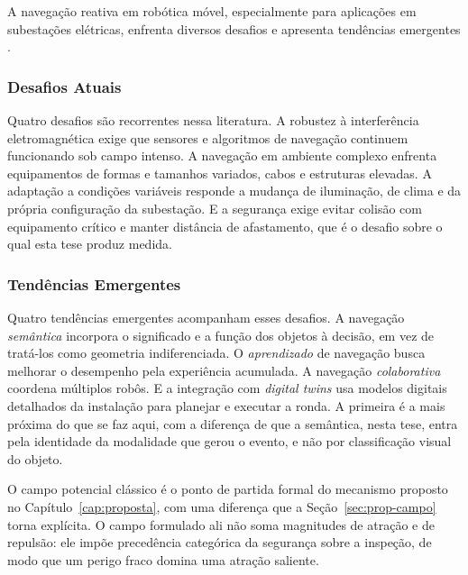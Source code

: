 A navegação reativa em robótica móvel, especialmente para aplicações em subestações elétricas, enfrenta diversos desafios e apresenta tendências emergentes \cite{Cadena2016, Lactec2022, Iberdrola2022}.

\subsubsection{Desafios Atuais}

Quatro desafios são recorrentes nessa literatura. A robustez à interferência
eletromagnética exige que sensores e algoritmos de navegação continuem funcionando sob
campo intenso. A navegação em ambiente complexo enfrenta equipamentos de formas e
tamanhos variados, cabos e estruturas elevadas. A adaptação a condições variáveis
responde a mudança de iluminação, de clima e da própria configuração da subestação. E a
segurança exige evitar colisão com equipamento crítico e manter distância de afastamento,
que é o desafio sobre o qual esta tese produz medida.

\subsubsection{Tendências Emergentes}

Quatro tendências emergentes acompanham esses desafios. A navegação \emph{semântica}
incorpora o significado e a função dos objetos à decisão, em vez de tratá-los como
geometria indiferenciada. O \emph{aprendizado} de navegação busca melhorar o desempenho
pela experiência acumulada. A navegação \emph{colaborativa} coordena múltiplos robôs. E a
integração com \textit{digital twins} usa modelos digitais detalhados da instalação para
planejar e executar a ronda. A primeira é a mais próxima do que se faz aqui, com a
diferença de que a semântica, nesta tese, entra pela identidade da modalidade que gerou o
evento, e não por classificação visual do objeto.

O campo potencial clássico é o ponto de partida formal do mecanismo proposto no Capítulo~\ref{cap:proposta}, com uma diferença que a Seção~\ref{sec:prop-campo} torna explícita. O campo formulado ali não soma magnitudes de atração e de repulsão: ele impõe precedência categórica da segurança sobre a inspeção, de modo que um perigo fraco domina uma atração saliente.

